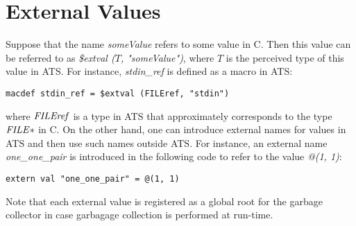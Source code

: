 \section{External Values}
Suppose that the name {\it someValue} refers to some value in C. Then this
value can be referred to as {\it \$extval ($T$, "someValue")}, where $T$ is
the perceived type of this value in ATS. For instance, {\it stdin\_ref} is
defined as a macro in ATS:
\begin{verbatim}
macdef stdin_ref = $extval (FILEref, "stdin")
\end{verbatim}
where ${\it FILEref}$ is a type in ATS that approximately corresponds to
the type ${\it FILE*}$ in C. On the other hand, one can introduce external
names for values in ATS and then use such names outside ATS. For instance,
an external name {\it one\_one\_pair} is introduced in the following code
to refer to the value {\it @(1, 1)}:
\begin{verbatim}
extern val "one_one_pair" = @(1, 1)
\end{verbatim}
Note that each external value is registered as a global root for the
garbage collector in case garbagage collection is performed at run-time.

